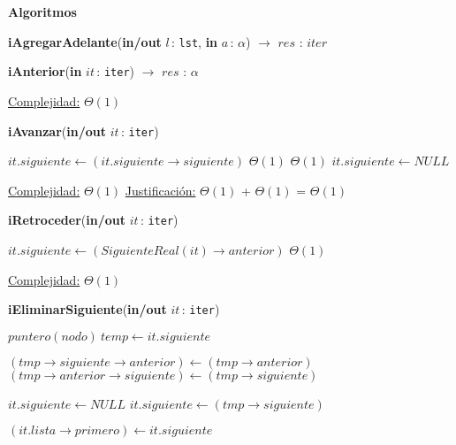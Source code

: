 \documentclass[a4paper,10pt]{article}
\let\TipoVariable=\texttt
\let\ModificadorArgumento=\textbf
\newcommand{\In}[2]{\ModificadorArgumento{in} \ensuremath{#1}\,: \TipoVariable{#2}\xspace}
\newcommand{\Inout}[2]{\ModificadorArgumento{in/out} \ensuremath{#1}\,: \TipoVariable{#2}\xspace}
\newenvironment{Algoritmos}{%
  \vspace*{2ex}%
  \noindent\textbf{\Large Algoritmos}%
  \vspace*{2ex}%
}{}
\begin{document}
\begin{Algoritmos}
\begin{







ithm}[H]{\textbf{iAgregarAdelante}(\Inout{l}{lst}, \In{a}{$\alpha$}) $\to$ $res$ : $iter$}
\begin{algorithm}[H]{\textbf{iAnterior}(\In{it}{iter}) $\to$ $res$ : $\alpha$}
\begin{algorithmic}[1]
			\medskip
			\Statex \underline{Complejidad:} $\Theta(1)$
    	\end{algorithmic}
\end{algorithm}



\begin{algorithm}[H]
	\begin{algorithmic}[1]
		\State \textbf{iAvanzar}(\Inout{it}{iter})
		
			\State $it.siguiente \gets (it.siguiente\rightarrow siguiente)$	\Comment $\Theta(1)$
				\Comment $\Theta(1)$
				\State $it.siguiente \gets NULL$	
			\EndIf

			\medskip
			\Statex \underline{Complejidad:} $\Theta(1)$
			\Statex \underline{Justificación:}  $\Theta(1)$ + $\Theta(1)$ = $\Theta(1)$
    	\end{algorithmic}
\end{algorithm}
	
	
\begin{algorithm}[H]
	\begin{algorithmic}[1]
		\State \textbf{iRetroceder}(\Inout{it}{iter})
		
			\State $it.siguiente \gets (SiguienteReal(it)\rightarrow anterior)$	\Comment $\Theta(1)$

			\medskip
			\Statex \underline{Complejidad:} $\Theta(1)$
    	\end{algorithmic}
\end{algorithm}
	
	
\begin{algorithm}[H]
	\begin{algorithmic}[1]
		\State \textbf{iEliminarSiguiente}(\Inout{it}{iter})
		
			\State $puntero(nodo) \ temp \gets it.siguiente$
			
			\State $(tmp\rightarrow siguiente\rightarrow anterior) \gets (tmp\rightarrow anterior)$
			\State $(tmp\rightarrow anterior\rightarrow siguiente) \gets (tmp\rightarrow siguiente)$
		
				\State $it.siguiente \gets NULL$
			\Else
				\State $it.siguiente \gets (tmp\rightarrow siguiente)$	
			\EndIf
			
				\State $(it.lista\rightarrow primero) \gets it.siguiente$
			\EndIf
			

\end{algorithmic}
\end{algorithm}
\end{







ithm}
\end{Algoritmos}
\end{document}
